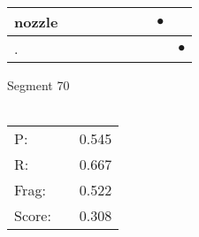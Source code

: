 \documentclass[landscape]{article}
\newcommand{\ssp}{\hspace{2pt}}
\newcommand{\mex}{\cellcolor{g}$\bullet$}
\begin{document}
\begin{tabular}{|l|p{10pt}|p{10pt}|p{10pt}|p{10pt}|p{10pt}|p{10pt}|p{10pt}|p{10pt}|}
\hline
\ssp \cellcolor{ref6}nozzle \ssp&\hspace{2pt}&\hspace{2pt}&\hspace{2pt}&\hspace{2pt}&\hspace{2pt}&\hspace{2pt}&\hspace{2pt}\mex&\hspace{2pt}\\
\hline
\ssp \cellcolor{ref7}. \ssp&\hspace{2pt}&\hspace{2pt}&\hspace{2pt}&\hspace{2pt}&\hspace{2pt}&\hspace{2pt}&\hspace{2pt}&\hspace{2pt}\mex\\
\hline
\end{tabular}

\vspace{6pt}
\noindent Segment 70\\\\
\noindent\begin{tabular}{lm{12pt}r}
\hline
P:&&0.545\\
R:&&0.667\\
Frag:&&0.522\\
Score:&&0.308\\
\end{tabular}

\newpage
\end{document}
